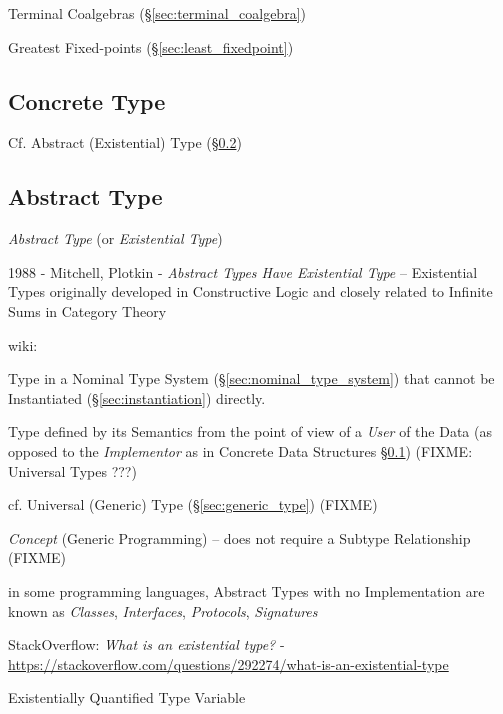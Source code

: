 Terminal Coalgebras (\S\ref{sec:terminal_coalgebra})

Greatest Fixed-points (\S\ref{sec:least_fixedpoint})



\subsection{Concrete Type}\label{sec:concrete_type}

\fist Cf. Abstract (Existential) Type (\S\ref{sec:abstract_type})



\subsection{Abstract Type}\label{sec:abstract_type}

\emph{Abstract Type} (or \emph{Existential Type})

1988 - Mitchell, Plotkin - \emph{Abstract Types Have Existential Type} --
Existential Types originally developed in Constructive Logic and closely
related to Infinite Sums in Category Theory

wiki:

Type in a Nominal Type System (\S\ref{sec:nominal_type_system}) that
cannot be Instantiated (\S\ref{sec:instantiation}) directly.

Type defined by its Semantics from the point of view of a
\emph{User} of the Data (as opposed to the \emph{Implementor} as in
Concrete Data Structures \S\ref{sec:concrete_type}) (FIXME: Universal Types ???)

cf. Universal (Generic) Type (\S\ref{sec:generic_type}) (FIXME)

\emph{Concept} (Generic Programming) -- does not require a Subtype Relationship
(FIXME)

in some programming languages, Abstract Types with no Implementation are known
as \emph{Classes}, \emph{Interfaces}, \emph{Protocols}, \emph{Signatures}

StackOverflow: \emph{What is an existential type?} -
\url{https://stackoverflow.com/questions/292274/what-is-an-existential-type}

Existentially Quantified Type Variable

